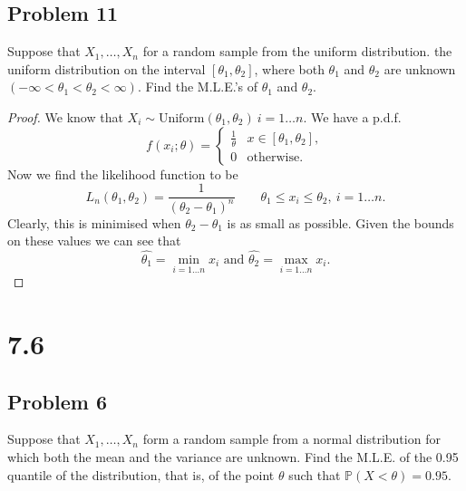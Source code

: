 \documentclass{article}
\renewcommand{\P}[1]{\mathbb{P}\left(#1\right)}
\newcommand{\randsamp}{X_1,\dots,X_n}
\begin{document}
\subsection*{Problem 11}
Suppose that $\randsamp$ for a random sample from the uniform distribution.
the uniform distribution on the interval $[\theta_1, \theta_2]$, where both
$\theta_1$ and $\theta_2$ are unknown $(-\infty < \theta_1 < \theta_2 < \infty)$.
Find the M.L.E.'s of $\theta_1$ and $\theta_2$.

\begin{proof}
    We know that $X_i \sim \text{Uniform}(\theta_1, \theta_2) \ i=1\dots n$.
    We have a p.d.f.
    \begin{equation*}
        f(x_i; \theta) = \begin{cases}
            \frac{1}{\theta} & x \in [\theta_1, \theta_2], \\
            0                & \text{otherwise}.
        \end{cases}
    \end{equation*}
    Now we find the likelihood function to be
    \begin{equation*}
        L_n(\theta_1, \theta_2) = \frac{1}{(\theta_2 - \theta_1)^n}
        \qquad \theta_1 \leq x_i \leq \theta_2, \ i = 1\dots n.
    \end{equation*}
    Clearly, this is minimised when $\theta_2 - \theta_1$ is as small as possible.
    Given the bounds on these values we can see that
    \begin{equation*}
        \hat{\theta_1} = \min_{i=1\dots n} x_i \text{ and }
        \hat{\theta_2} = \max_{i=1\dots n} x_i.
    \end{equation*}
\end{proof}

\section*{7.6}
\subsection*{Problem 6}
Suppose that $\randsamp$ form a random sample from a normal distribution for which
both the mean and the variance are unknown. Find the M.L.E. of the 0.95
quantile of the distribution, that is, of the point $\theta$ such that
$\P{X < \theta} = 0.95$.
\end{document}

